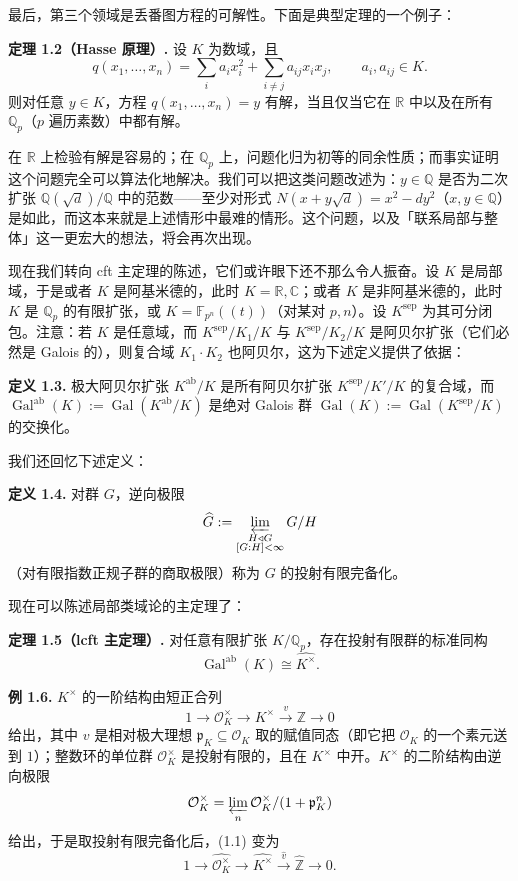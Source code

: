 最后，第三个领域是丢番图方程的可解性。下面是典型定理的一个例子：

\textbf{定理 1.2（Hasse 原理）.} 设 $K$ 为数域，且
\[
  q(x_1,\ldots,x_n)=\sum_i a_i x_i^2+\sum_{i\neq j}a_{ij}x_ix_j,
  \qquad a_i,a_{ij}\in K.
\]
则对任意 $y\in K$，方程 $q(x_1,\ldots,x_n)=y$ 有解，当且仅当它在 $\mathbb{R}$ 中以及在所有 $\mathbb{Q}_p$（$p$ 遍历素数）中都有解。

在 $\mathbb{R}$ 上检验有解是容易的；在 $\mathbb{Q}_p$ 上，问题化归为初等的同余性质；而事实证明这个问题完全可以算法化地解决。我们可以把这类问题改述为：$y\in\mathbb{Q}$ 是否为二次扩张 $\mathbb{Q}(\sqrt{d})/\mathbb{Q}$ 中的范数——至少对形式 $N(x+y\sqrt{d})=x^2-dy^2$（$x,y\in\mathbb{Q}$）是如此，而这本来就是上述情形中最难的情形。这个问题，以及「联系局部与整体」这一更宏大的想法，将会再次出现。

现在我们转向 cft 主定理的陈述，它们或许眼下还不那么令人振奋。设 $K$ 是局部域，于是或者 $K$ 是阿基米德的，此时 $K=\mathbb{R},\mathbb{C}$；或者 $K$ 是非阿基米德的，此时 $K$ 是 $\mathbb{Q}_p$ 的有限扩张，或 $K=\mathbb{F}_{p^n}((t))$（对某对 $p,n$）。设 $K^{\mathrm{sep}}$ 为其可分闭包。注意：若 $K$ 是任意域，而 $K^{\mathrm{sep}}/K_1/K$ 与 $K^{\mathrm{sep}}/K_2/K$ 是阿贝尔扩张（它们必然是 Galois 的），则复合域 $K_1\cdot K_2$ 也阿贝尔，这为下述定义提供了依据：

\textbf{定义 1.3.} 极大阿贝尔扩张 $K^{\mathrm{ab}}/K$ 是所有阿贝尔扩张 $K^{\mathrm{sep}}/K'/K$ 的复合域，而 $\operatorname{Gal}^{\mathrm{ab}}(K):=\operatorname{Gal}(K^{\mathrm{ab}}/K)$ 是绝对 Galois 群 $\operatorname{Gal}(K):=\operatorname{Gal}(K^{\mathrm{sep}}/K)$ 的交换化。

我们还回忆下述定义：

\textbf{定义 1.4.} 对群 $G$，逆向极限
\[
  \widehat{G}:=\varprojlim_{\substack{H\triangleleft G\\ [G:H]<\infty}} G/H
\]
（对有限指数正规子群的商取极限）称为 $G$ 的投射有限完备化。

现在可以陈述局部类域论的主定理了：

\textbf{定理 1.5（lcft 主定理）.} 对任意有限扩张 $K/\mathbb{Q}_p$，存在投射有限群的标准同构
\[
  \operatorname{Gal}^{\mathrm{ab}}(K)\cong\widehat{K^{\times}}.
\]

\textbf{例 1.6.} $K^{\times}$ 的一阶结构由短正合列
\begin{equation}\tag{1.1}
  1\to\mathcal{O}_K^{\times}\to K^{\times}\xrightarrow{v}\mathbb{Z}\to 0
\end{equation}
给出，其中 $v$ 是相对极大理想 $\mathfrak{p}_K\subseteq\mathcal{O}_K$ 取的赋值同态（即它把 $\mathcal{O}_K$ 的一个素元送到 $1$）；整数环的单位群 $\mathcal{O}_K^{\times}$ 是投射有限的，且在 $K^{\times}$ 中开。$K^{\times}$ 的二阶结构由逆向极限
\[
  \mathcal{O}_K^{\times}=\varprojlim_n \mathcal{O}_K^{\times}/(1+\mathfrak{p}_K^n)
\]
给出，于是取投射有限完备化后，(1.1) 变为
\[
  1\to\widehat{\mathcal{O}_K^{\times}}\to\widehat{K^{\times}}\xrightarrow{\hat v}\widehat{\mathbb{Z}}\to 0.
\]


